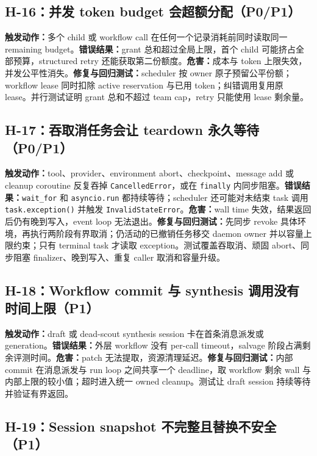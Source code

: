 \documentclass[11pt,a4paper,fontset=fandol]{ctexart}
\newcommand{\code}[1]{\texttt{#1}}
\begin{document}
\subsection{H-16：并发 token budget 会超额分配（P0/P1）}

\textbf{触发动作：}多个 child 或 workflow call 在任何一个记录消耗前同时读取同一 remaining budget。\textbf{错误结果：}grant 总和超过全局上限，首个 child 可能挤占全部预算，structured retry 还能获取第二份额度。\textbf{危害：}成本与 token 上限失效，并发公平性消失。\textbf{修复与回归测试：}scheduler 按 owner 原子预留公平份额；workflow lease 同时扣除 active reservation 与已用 token；纠错调用复用原 lease。并行测试证明 grant 总和不超过 team cap，retry 只能使用 lease 剩余量。

\subsection{H-17：吞取消任务会让 teardown 永久等待（P0/P1）}

\textbf{触发动作：}tool、provider、environment abort、checkpoint、message add 或 cleanup coroutine 反复吞掉 \code{CancelledError}，或在 \code{finally} 内同步阻塞。\textbf{错误结果：}\code{wait\_for} 和 \code{asyncio.run} 都持续等待；scheduler 还可能对未结束 task 调用 \code{task.exception()} 并触发 \code{InvalidStateError}。\textbf{危害：}wall time 失效，结果返回后仍有晚到写入，event loop 无法退出。\textbf{修复与回归测试：}先同步 revoke 具体环境，再执行两阶段有界取消；仍活动的已撤销任务移交 daemon owner 并以容量上限约束；只有 terminal task 才读取 exception。测试覆盖吞取消、顽固 abort、同步阻塞 finalizer、晚到写入、重复 caller 取消和容量升级。

\subsection{H-18：Workflow commit 与 synthesis 调用没有时间上限（P1）}

\textbf{触发动作：}draft 或 dead-scout synthesis session 卡在首条消息派发或 generation。\textbf{错误结果：}外层 workflow 没有 per-call timeout，salvage 阶段占满剩余评测时间。\textbf{危害：}patch 无法提取，资源清理延迟。\textbf{修复与回归测试：}内部 commit 在消息派发与 run loop 之间共享一个 deadline，取 workflow 剩余 wall 与内部上限的较小值；超时进入统一 owned cleanup。测试让 draft session 持续等待并验证有界返回。

\subsection{H-19：Session snapshot 不完整且替换不安全（P1）}
\end{document}
